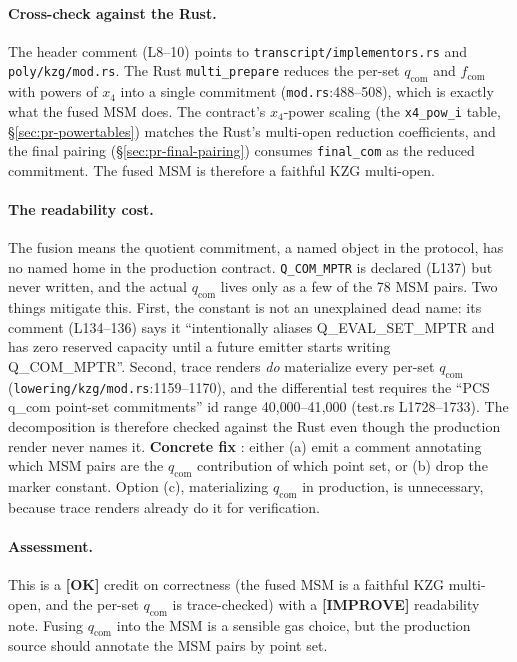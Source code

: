 \paragraph{Cross-check against the Rust.}
The header comment (L8--10) points to
\texttt{transcript/\allowbreak{}implementors.rs} and
\texttt{poly/kzg/mod.rs}. The Rust \texttt{multi\_prepare} reduces
the per-set $q_\text{com}$ and $f_\text{com}$ with powers of $x_4$
into a single commitment (\texttt{mod.rs}:488--508), which is
exactly what the fused MSM does. The contract's $x_4$-power scaling
(the \texttt{x4\_pow\_i} table, \S\ref{sec:pr-powertables})
matches the Rust's multi-open reduction coefficients, and the
final pairing (\S\ref{sec:pr-final-pairing}) consumes
\texttt{final\_com} as the reduced commitment. The fused MSM is
therefore a faithful KZG multi-open.

\paragraph{The readability cost.}
The fusion means the quotient commitment, a named object in the
protocol, has no named home in the production contract.
\texttt{Q\_COM\_MPTR} is declared (L137) but never written, and
the actual $q_\text{com}$ lives only as a few of the 78 MSM
pairs.  Two things mitigate this. First, the
constant is not an unexplained dead name: its comment (L134--136)
says it ``intentionally aliases Q\_EVAL\_SET\_MPTR and has zero
reserved capacity until a future emitter starts writing
Q\_COM\_MPTR''. Second, trace renders \emph{do} materialize every
per-set $q_\text{com}$ (\texttt{lowering/\allowbreak{}kzg/\allowbreak{}mod.rs}:1159--1170),
and the differential test requires the ``PCS q\_com point-set
commitments'' id range 40{,}000--41{,}000 (test.rs L1728--1733).
The decomposition is therefore checked against the Rust even
though the production render never names it. \textbf{Concrete fix}
: either (a) emit a comment annotating which MSM
pairs are the $q_\text{com}$ contribution of which point set, or
(b) drop the marker constant. Option (c), materializing
$q_\text{com}$ in production, is unnecessary, because trace renders
already do it for verification.

\paragraph{Assessment.} This is a
\textcolor{tracegreen}{\textbf{[OK]}} credit on correctness
(the fused MSM is a faithful KZG multi-open, and the per-set
$q_\text{com}$ is trace-checked) with a
\textcolor{codegenblue}{\textbf{[IMPROVE]}} readability note.
Fusing $q_\text{com}$ into the MSM is a sensible gas choice, but
the production source should annotate the MSM pairs by point set.

